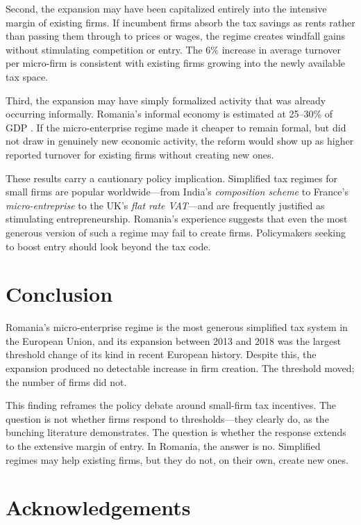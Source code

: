 \documentclass[12pt]{article}
\begin{document}
Second, the expansion may have been capitalized entirely into the intensive margin of existing firms. If incumbent firms absorb the tax savings as rents rather than passing them through to prices or wages, the regime creates windfall gains without stimulating competition or entry. The 6\% increase in average turnover per micro-firm is consistent with existing firms growing into the newly available tax space.

Third, the expansion may have simply formalized activity that was already occurring informally. Romania's informal economy is estimated at 25--30\% of GDP \citep{medina2018shadow}. If the micro-enterprise regime made it cheaper to remain formal, but did not draw in genuinely new economic activity, the reform would show up as higher reported turnover for existing firms without creating new ones.

These results carry a cautionary policy implication. Simplified tax regimes for small firms are popular worldwide---from India's \textit{composition scheme} to France's \textit{micro-entreprise} to the UK's \textit{flat rate VAT}---and are frequently justified as stimulating entrepreneurship. Romania's experience suggests that even the most generous version of such a regime may fail to create firms. Policymakers seeking to boost entry should look beyond the tax code.


\section{Conclusion}

Romania's micro-enterprise regime is the most generous simplified tax system in the European Union, and its expansion between 2013 and 2018 was the largest threshold change of its kind in recent European history. Despite this, the expansion produced no detectable increase in firm creation. The threshold moved; the number of firms did not.

This finding reframes the policy debate around small-firm tax incentives. The question is not whether firms respond to thresholds---they clearly do, as the bunching literature demonstrates. The question is whether the response extends to the extensive margin of entry. In Romania, the answer is no. Simplified regimes may help existing firms, but they do not, on their own, create new ones.

\section*{Acknowledgements}
\end{document}
